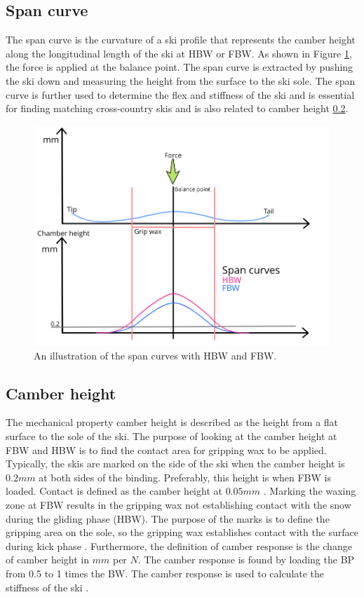 \subsection{Span curve}
\label{subsec:spancurve}
The span curve is the curvature of a ski profile that represents the camber height along the longitudinal length of the ski at HBW or FBW. As shown in Figure \ref{fig:spancurve}, the force is applied at the balance point. The span curve is extracted by pushing the ski down and measuring the height from the surface to the ski sole. The span curve is further used to determine the flex and stiffness of the ski and is essential for finding matching cross-country skis and is also related to camber height \ref{subsec:camberheight}.

\begin{figure}
    \centering
    \includegraphics[width=1\textwidth]{figures/spancurve.png}
    \caption{An illustration of the span curves with HBW and FBW.}
    \label{fig:spancurve}
\end{figure}

\subsection{Camber height}
\label{subsec:camberheight}
The mechanical property camber height is described as the height from a flat surface to the sole of the ski.
The purpose of looking at the camber height at FBW and HBW is to find the contact area for gripping wax to be applied. Typically, the skis are marked on the side of the ski when the camber height is $0.2mm$ at both sides of the binding. Preferably, this height is when FBW is loaded. Contact is defined as the camber height at $0.05mm$ \citep{breitschadel_technical_2014}. Marking the waxing zone at FBW results in the gripping wax not establishing contact with the snow during the gliding phase (HBW).  The purpose of the marks is to define the gripping area on the sole, so the gripping wax establishes contact with the surface during kick phase  \citep{breitschadel_variation_2012}.
Furthermore, the definition of camber response is the change of camber height in $mm$ per $N$. The camber response is found by loading the BP from 0.5 to 1 times the BW. The camber response is used to calculate the stiffness of the ski \citep{breitschadel_technical_2014}.

